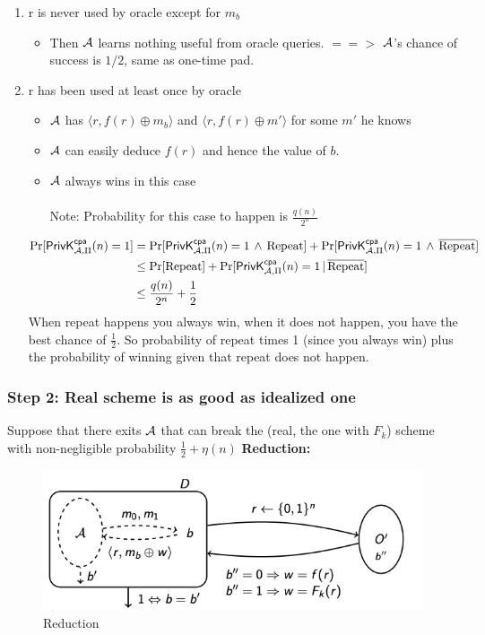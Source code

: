 \documentclass[12pt]{article}
\begin{document}
\begin{enumerate}
\item r is never used by oracle except for $m_b$  
\begin{itemize}
\item Then $\mathcal{A}$ learns nothing useful from oracle queries. $==>$ $\mathcal{A}$'s chance of success is $1/2$, same as one-time pad.
\end{itemize}

\item r has been used at least once by oracle
\begin{itemize}
\item $\mathcal{A}$ has $\langle r,f(r)\oplus m_b \rangle$ and $\langle r,f(r)\oplus m' \rangle$ for some $m'$ he knows
\item $\mathcal{A}$ can easily deduce $f(r)$ and hence the value of $b$.
\item $\mathcal{A}$ always wins in this case\\\\
Note: Probability for this case to happen is $\frac{q(n)}{2^n}$
\end{itemize}
\begin{align*}
\Pr[\mathsf{PrivK}_{\mathcal{A},\Pi}^\mathsf{cpa}(n)=1] &= \Pr[\mathsf{PrivK}_{\mathcal{A},\Pi}^\mathsf{cpa}(n)=1 \, \land \, \text{Repeat}] + \Pr[\mathsf{PrivK}_{\mathcal{A},\Pi}^\mathsf{cpa}(n)=1 \, \land \, \overline{\text{Repeat}}] \\
&\le \Pr[\text{Repeat}] + \Pr[\mathsf{PrivK}_{\mathcal{A},\Pi}^\mathsf{cpa}(n)=1 \, | \, \overline{\text{Repeat}}]\\
&\le \frac{q(n)}{2^n} + \frac12
\end{align*}
When repeat happens you always win, when it does not happen, you have the best chance of $\frac12$. So probability of repeat times 1 (since you always win) plus the probability of winning given that repeat does not happen.
\end{enumerate}

\subsubsection{Step 2: Real scheme is as good as idealized one}
Suppose that there exits $\mathcal{A}$ that can break the (real, the one with $F_k$) scheme with non-negligible probability $\frac12 + \eta(n)$
\newpage
\textbf{Reduction:}
\begin{figure}[ht]
    \centering
    \includegraphics[width=12cm]{figures/f1.png}
    \caption{Reduction}
\end{figure}
\end{document}
